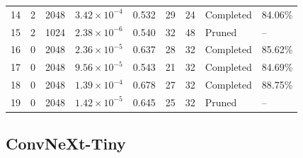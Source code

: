 {\begin{longtable}{lccccccll}
14 & 2 & 2048 & $3.42\times10^{-4}$ & 0.532 & 29 & 24 & Completed & 84.06\% \\
15 & 2 & 1024 & $2.38\times10^{-6}$ & 0.540 & 32 & 48 & Pruned & -- \\
16 & 0 & 2048 & $2.36\times10^{-5}$ & 0.637 & 28 & 32 & Completed & 85.62\% \\
17 & 0 & 2048 & $9.56\times10^{-5}$ & 0.543 & 21 & 32 & Completed & 84.69\% \\
\rowcolor{gray!15} 18 & 0 & 2048 & $1.39\times10^{-4}$ & 0.678 & 27 & 32 & Completed & 88.75\% \\
19 & 0 & 2048 & $1.42\times10^{-5}$ & 0.645 & 25 & 32 & Pruned & -- \\
\end{longtable}
}

\Needspace*{0.6\textheight}
\subsection{ConvNeXt-Tiny}

